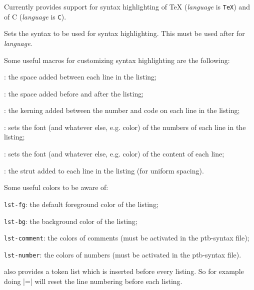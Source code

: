 Currently \pdftoolbox{} provides support for syntax highlighting of \TeX{} ({\it language} is {\tt TeX}) and of C ({\it language} is {\tt C}).
\emacroexp

Sets the syntax to be used for syntax highlighting.
This must be used after \macro\loadsyntax{} for {\it language}.
\emacroexp

Some useful macros for customizing syntax highlighting are the following:
\blist
    \item \macro\lstlineskip: the space added between each line in the listing;
    \item \macro\lstvbuf: the space added before and after the listing;
    \item \macro\lstlinenumbuf: the kerning added between the number and code on each line in the listing;
    \item \macro\lstnumfontset: sets the font (and whatever else, e.g. color) of the numbers of each line in the listing;
    \item \macro\lstfontset: sets the font (and whatever else, e.g. color) of the content of each line;
    \item \macro\lststrut: the strut added to each line in the listing (for uniform spacing).
\elist

Some useful colors to be aware of:
\blist
    \item {\tt lst-fg}: the default foreground color of the listing;
    \item {\tt lst-bg}: the background color of the listing;
    \item {\tt lst-comment}: the colors of comments (must be activated in the ptb-syntax file);
    \item {\tt lst-number}: the colors of numbers (must be activated in the ptb-syntax file).
\elist

\pdftoolbox{} also provides a token list \macro\everylisting{} which is inserted before every listing.
So for example doing \inlinecode|\everylisting={}| will reset the line numbering before each listing.

